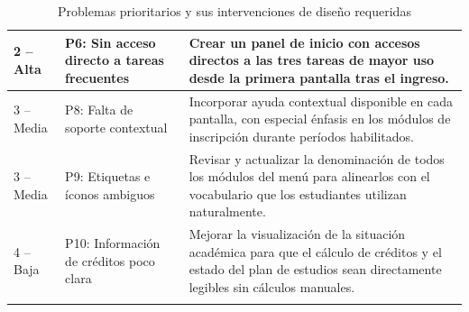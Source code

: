 {\begin{longtable}{|p{2.3cm}|p{4.2cm}|p{7.3cm}|}
2 -- Alta & P6: Sin acceso directo a tareas frecuentes & Crear un panel de inicio con accesos directos a las tres tareas de mayor uso desde la primera pantalla tras el ingreso. \\
\hline

3 -- Media & P8: Falta de soporte contextual & Incorporar ayuda contextual disponible en cada pantalla, con especial énfasis en los módulos de inscripción durante períodos habilitados. \\
\hline

3 -- Media & P9: Etiquetas e íconos ambiguos & Revisar y actualizar la denominación de todos los módulos del menú para alinearlos con el vocabulario que los estudiantes utilizan naturalmente. \\
\hline

4 -- Baja & P10: Información de créditos poco clara & Mejorar la visualización de la situación académica para que el cálculo de créditos y el estado del plan de estudios sean directamente legibles sin cálculos manuales. \\
\hline

\caption{Problemas prioritarios y sus intervenciones de diseño requeridas}\label{tab:problemas-prioritarios-intervenciones}
\end{longtable}
}
